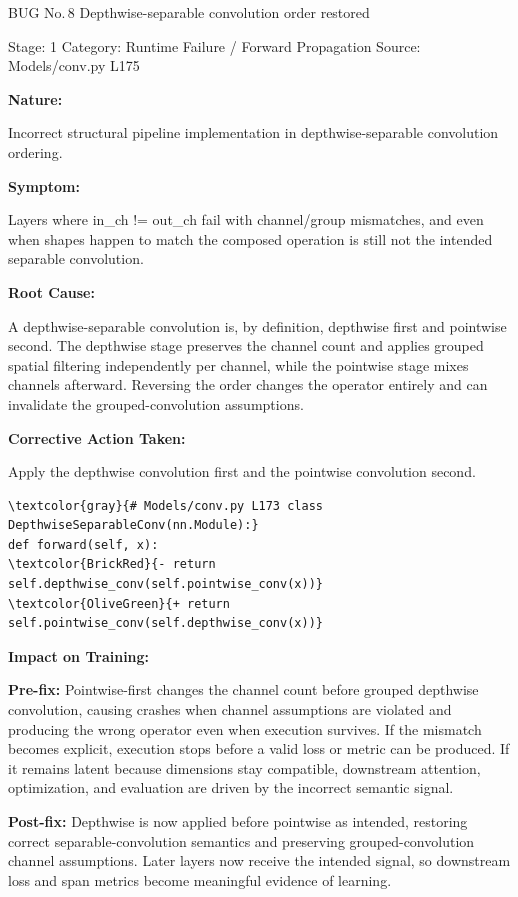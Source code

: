 \documentclass[10pt]{article}
\newcommand{\FieldLabel}[1]{%
 {\bfseries #1:}\par
}
\begin{document}
\begin{bugbox}{BUG No.\,8 \quad Depthwise-separable convolution order restored}
{\color{MetaGray}\small Stage: 1 \;\textbar\; Category: Runtime Failure / Forward Propagation \;\textbar\; Source: Models/conv.py L175\par}
\vspace{0.22em}
\FieldLabel{Nature}
Incorrect structural pipeline implementation in depthwise-separable convolution ordering.
\par
\vspace{0.35em}
\FieldLabel{Symptom}
Layers where in\_ch != out\_ch fail with channel/group mismatches, and even when shapes happen to match the composed operation is still not the intended separable convolution.
\par
\vspace{0.35em}
\FieldLabel{Root Cause}
A depthwise-separable convolution is, by definition, depthwise first and pointwise second. The depthwise stage preserves the channel count and applies grouped spatial filtering independently per channel, while the pointwise stage mixes channels afterward. Reversing the order changes the operator entirely and can invalidate the grouped-convolution assumptions.
\par
\vspace{0.35em}
\FieldLabel{Corrective Action Taken}
Apply the depthwise convolution first and the pointwise convolution second.
\par
\vspace{0.35em}
\begin{Verbatim}[commandchars=\\\{\},fontsize=\footnotesize,breaklines=true,breaksymbol={},frame=leftline,framerule=2pt,rulecolor=\color{gray!40},xleftmargin=6pt,formatcom=\singlespacing]
\textcolor{gray}{# Models/conv.py L173 class DepthwiseSeparableConv(nn.Module):}
def forward(self, x):
\textcolor{BrickRed}{- return self.depthwise_conv(self.pointwise_conv(x))}
\textcolor{OliveGreen}{+ return self.pointwise_conv(self.depthwise_conv(x))}
\end{Verbatim}
\vspace{0.22em}
\FieldLabel{Impact on Training}
\textbf{Pre-fix:} Pointwise-first changes the channel count before grouped depthwise convolution, causing crashes when channel assumptions are violated and producing the wrong operator even when execution survives. If the mismatch becomes explicit, execution stops before a valid loss or metric can be produced. If it remains latent because dimensions stay compatible, downstream attention, optimization, and evaluation are driven by the incorrect semantic signal.\par\smallskip
\textbf{Post-fix:} Depthwise is now applied before pointwise as intended, restoring correct separable-convolution semantics and preserving grouped-convolution channel assumptions. Later layers now receive the intended signal, so downstream loss and span metrics become meaningful evidence of learning.
\par
\vspace{0.35em}
\end{bugbox}
\end{document}
